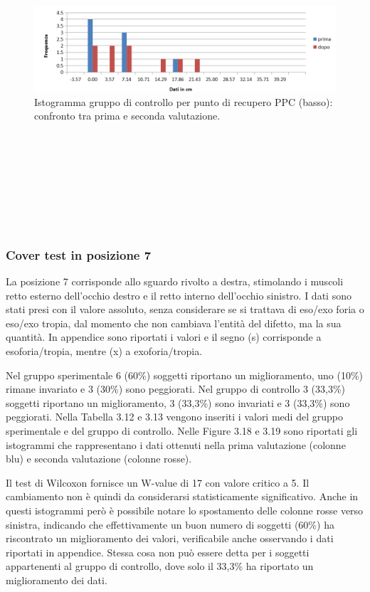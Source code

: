  \begin{figure}[h!]
	\centering
	\includegraphics[scale=0.38]{source/grafici/Grafico_recupero_PPC_basso_NON_trattati.png}
	\caption[Istogramma gruppo di controllo per punto di recupero PPC (basso)]{Istogramma gruppo di controllo per punto di recupero PPC (basso): confronto tra prima e seconda valutazione.}
	\label{fig:issuexample}
\end{figure}
\\\ \\\  \\\ \\\ \\\ \\\
\subsubsection{Cover test in posizione 7}

La posizione 7 corrisponde allo sguardo rivolto a destra, stimolando i muscoli retto esterno dell’occhio destro e il retto interno dell’occhio sinistro. I dati sono stati presi con il valore assoluto, senza considerare se si trattava di eso/exo foria o eso/exo tropia, dal momento che non cambiava l’entità del difetto, ma la sua quantità. In appendice sono riportati i valori e il segno (s) corrisponde a esoforia/tropia, mentre (x) a exoforia/tropia. 

Nel gruppo sperimentale 6 (60\%) soggetti riportano un miglioramento, uno (10\%) rimane invariato e 3 (30\%) sono peggiorati. Nel gruppo di controllo 3 (33,3\%) soggetti riportano un miglioramento, 3 (33,3\%) sono invariati e 3 (33,3\%) sono peggiorati. Nella Tabella 3.12 e 3.13 vengono inseriti i valori medi del gruppo sperimentale e del gruppo di controllo. Nelle Figure 3.18 e 3.19 sono riportati gli istogrammi che rappresentano i dati ottenuti nella prima valutazione (colonne blu) e seconda valutazione (colonne rosse).

Il test di Wilcoxon fornisce un W-value di 17 con valore critico a 5. Il cambiamento non è quindi da considerarsi statisticamente significativo. Anche in questi istogrammi però è possibile notare lo spostamento delle colonne rosse verso sinistra, indicando che effettivamente un buon numero di soggetti (60\%) ha riscontrato un miglioramento dei valori, verificabile anche osservando i dati riportati in appendice. Stessa cosa non può essere detta per i soggetti appartenenti al gruppo di controllo, dove solo il 33,3\% ha riportato un miglioramento dei dati.


